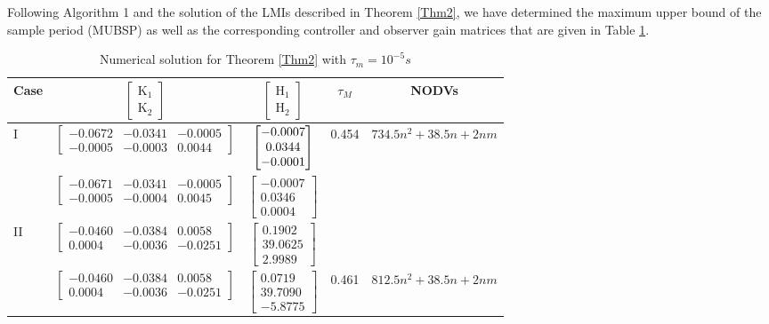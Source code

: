 \documentclass[preprint,11pt]{elsarticle}
\begin{document}
Following Algorithm 1 and the solution of the LMIs described in Theorem \ref{Thm2}, we have determined the maximum upper bound of the sample period (MUBSP) as well as the corresponding controller and observer gain matrices that are given in Table \ref{Table-6}.
\begin{table}[!ht]
\centering
\caption{Numerical solution for Theorem \ref{Thm2} with $\tau_m=10^{-5}s$ }
\label{Table-6}
\begin{tabular}{l|c|c|c|c}   \hline
Case & $\begin{bmatrix}\mathrm{K}_1\\\mathrm{K}_2\end{bmatrix}$&$\begin{bmatrix}\mathrm{H}_1\\\mathrm{H}_2\end{bmatrix}$&$\tau_M$&NODVs\\\hline
I  &
$\begin{bmatrix}
 -0.0672 &  -0.0341 &  -0.0005\\
   -0.0005 &  -0.0003&    0.0044
\end{bmatrix}$
& $\begin{bmatrix}
 -0.0007\\
    0.0344\\
   -0.0001
\end{bmatrix}
\vspace{0.01cm}
$&0.454&$734.5n^2+38.5n+2nm$\\
&
$\begin{bmatrix}
   -0.0671  & -0.0341  & -0.0005\\
   -0.0005  & -0.0004  &  0.0045
\end{bmatrix}
$& $\begin{bmatrix}
   -0.0007\\
    0.0346\\
    0.0004
\end{bmatrix}
$\vspace{0.01cm}&&\\
\hline
II  & $\begin{bmatrix}
-0.0460 &  -0.0384  &  0.0058\\
    0.0004&   -0.0036&   -0.0251
\end{bmatrix}$
&$\begin{bmatrix}
0.1902\\
   39.0625\\
    2.9989
\end{bmatrix}$
\vspace{0.01cm}&&\\
 &
$\begin{bmatrix}
-0.0460 &  -0.0384 &   0.0058\\
    0.0004 &  -0.0036 &  -0.0251
\end{bmatrix}$
&$\begin{bmatrix}
0.0719\\
   39.7090\\
   -5.8775
\end{bmatrix}$
&0.461&$812.5n^2+38.5n+2nm$\\
\hline
\end{tabular}
\vspace{-0.4cm}
\end{table}
\end{document}
